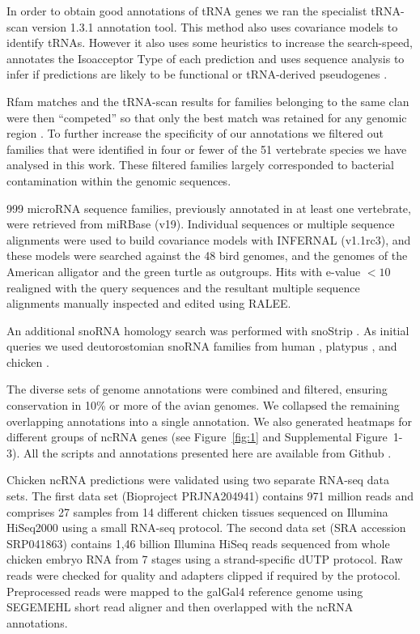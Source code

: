 \documentclass[10pt]{bmc_article}
\newcommand {\ppg}[1]{\textcolor{blue}{#1}}
\newenvironment{bmcformat}{\begin{raggedright}\baselineskip20pt\sloppy\setboolean{publ}{false}}{\end{raggedright}\baselineskip20pt\sloppy}
\begin{document}
\begin{bmcformat}
In order to obtain good annotations of tRNA genes we ran the
specialist tRNA-scan version 1.3.1 annotation tool. This method also
uses covariance models to identify tRNAs. However it also uses some
heuristics to increase the search-speed, annotates the Isoacceptor
Type of each prediction and uses sequence analysis to infer if
predictions are likely to be functional or tRNA-derived pseudogenes
\cite{Lowe:1997,Chan:2009}.

Rfam matches and the tRNA-scan results for families belonging to the
same clan were then ``competed'' so that only the best match was
retained for any genomic region \cite{Gardner:2011a}.  To further
increase the specificity of our annotations we filtered out families
that were identified in four or fewer of the 51 vertebrate species we
have analysed in this work. These filtered families largely
corresponded to bacterial contamination within the genomic sequences.

999 microRNA sequence families, previously annotated in at least one
vertebrate, were retrieved from miRBase (v19). Individual sequences or
multiple sequence alignments were used to build covariance models with
INFERNAL (v1.1rc3), and these models were searched against the 48 bird
genomes, and the genomes of the American alligator and the green
turtle as outgroups. Hits with e-value $<10$ realigned with the query
sequences and the resultant multiple sequence alignments manually
inspected and edited using RALEE.

An additional snoRNA homology search was performed with snoStrip
\cite{Bartschat:2013}. As initial queries we used deutorostomian
snoRNA families from human \cite{Lestrade:2006}, platypus
\cite{Schmitz:2008}, and chicken \cite{Shao:2009}.


The diverse sets of genome annotations were combined and filtered,
ensuring conservation in 10\% or more of the avian genomes. We
collapsed the remaining overlapping annotations into a single
annotation. We also generated heatmaps for different groups of ncRNA
genes (see Figure~\ref{fig:1} and Supplemental Figure~1-3). All the
scripts and annotations presented here are available from Github
\cite{gitrepo}.

Chicken ncRNA predictions were validated using two separate RNA-seq
data sets. The first data set (Bioproject PRJNA204941) contains 971
million reads and comprises 27 samples from 14 different chicken
tissues sequenced on Illumina HiSeq2000 using a small RNA-seq
protocol. The second data set (SRA accession SRP041863) contains 1,46
billion Illumina HiSeq reads sequenced from whole chicken embryo RNA
from 7 stages using a strand-specific dUTP protocol. Raw reads were
checked for quality and adapters clipped if required by the
protocol. Preprocessed reads were mapped to the galGal4 reference
genome using SEGEMEHL short read aligner \cite{segemehl} and then
overlapped with the ncRNA annotations.



\end{bmcformat}
\end{document}

